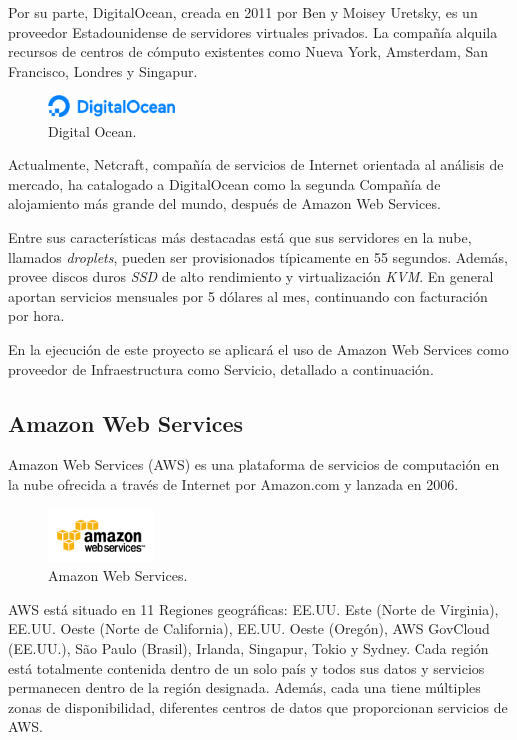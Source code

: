 Por su parte, DigitalOcean, creada en 2011 por Ben y Moisey Uretsky, es un proveedor Estadounidense de servidores virtuales privados. La compañía alquila recursos de centros de cómputo existentes como Nueva York, Amsterdam, San Francisco, Londres y Singapur.

\begin{figure}[H]
\centering
\includegraphics[width=0.3\textwidth]{images/figures/digitalocean.png}
\caption{Digital Ocean.\label{fig:figure_placement_example}}
\end{figure}

Actualmente, Netcraft, compañía de servicios de Internet orientada al análisis de mercado, ha catalogado a DigitalOcean como la segunda Compañía de alojamiento más grande del mundo, después de Amazon Web Services.

Entre sus características más destacadas está que sus servidores en la nube, llamados \textit{droplets}, pueden ser provisionados típicamente en 55 segundos. Además, provee discos duros \textit{SSD} de alto rendimiento y virtualización \textit{KVM}. En general aportan servicios mensuales por 5 dólares al mes, continuando con facturación por hora.

En la ejecución de este proyecto se aplicará el uso de Amazon Web Services como proveedor de Infraestructura como Servicio, detallado a continuación.

\subsection{Amazon Web Services}

Amazon Web Services (AWS) es una plataforma de servicios de computación en la nube ofrecida a través de Internet por Amazon.com y lanzada en 2006.

\begin{figure}[H]
\centering
\includegraphics[width=0.25\textwidth]{images/figures/aws.png}
\caption{Amazon Web Services.\label{fig:figure_placement_example}}
\end{figure}

AWS está situado en 11 Regiones geográficas: EE.UU. Este (Norte de Virginia), EE.UU. Oeste (Norte de California), EE.UU. Oeste (Oregón), AWS GovCloud (EE.UU.), São Paulo (Brasil), Irlanda, Singapur, Tokio y Sydney. Cada región está totalmente contenida dentro de un solo país y todos sus datos y servicios permanecen dentro de la región designada. Además, cada una tiene múltiples zonas de disponibilidad, diferentes centros de datos que proporcionan servicios de AWS.

